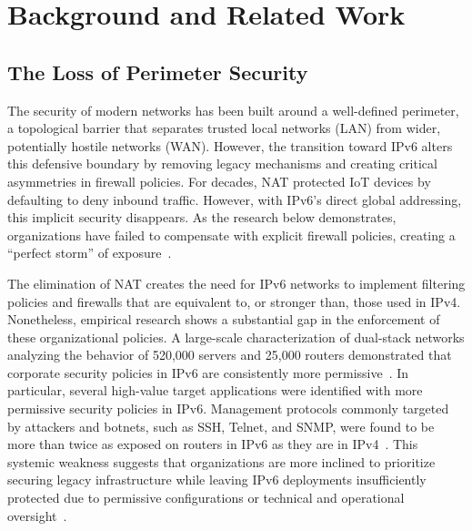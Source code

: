 \chapter{Background and Related Work}\label{chap:background}

\section{The Loss of Perimeter Security}\label{sec:loss-of-perimeter-security}
The  security  of modern networks has been built around a well-defined perimeter, a topological barrier that separates trusted local networks (LAN) from wider, potentially hostile networks (WAN). However, the transition toward IPv6 alters this defensive boundary by removing legacy mechanisms and creating critical asymmetries in firewall policies. For decades, NAT protected IoT devices by defaulting to deny inbound traffic. However, with IPv6's direct global addressing, this implicit security disappears. As the research below demonstrates, organizations have failed to compensate with explicit firewall policies, creating a ``perfect storm'' of exposure~\cite{rye2025firewalls, czyz2016backdoor}.

The elimination of NAT creates the need for IPv6 networks to implement filtering policies and firewalls that are equivalent to, or stronger than, those used in IPv4. Nonetheless, empirical research shows a substantial gap in the enforcement of these organizational policies. A large-scale characterization of dual-stack networks analyzing the behavior of 520,000 servers and 25,000 routers demonstrated that corporate security policies in IPv6 are consistently more permissive~\cite{czyz2016backdoor}. In particular, several high-value target applications were identified with more permissive security policies in IPv6. Management protocols commonly targeted by attackers and botnets, such as SSH, Telnet, and SNMP, were found to be more than twice as exposed on routers in IPv6 as they are in IPv4~\cite{czyz2016backdoor}. This systemic weakness suggests that organizations are more inclined to prioritize securing legacy infrastructure while leaving IPv6 deployments insufficiently protected due to permissive configurations or technical and operational oversight~\cite{czyz2016backdoor}.

